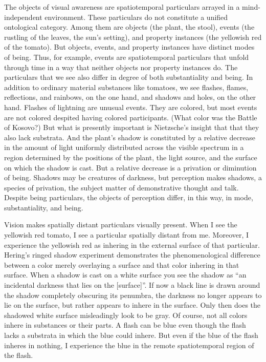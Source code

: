 \documentclass[12pt]{article}
\begin{document}
The objects of visual awareness are spatiotemporal particulars arrayed in a mind-independent environment. These particulars do not constitute a unified ontological category. Among them are objects (the plant, the stool), events (the rustling of the leaves, the sun's setting), and property instances (the yellowish red of the tomato). But objects, events, and property instances have distinct modes of being. Thus, for example, events are spatiotemporal particulars that unfold through time in a way that neither objects nor property instances do. The particulars that we see also differ in degree of both substantiality and being. In addition to ordinary material substances like tomatoes, we see flashes, flames, reflections, and rainbows, on the one hand, and shadows and holes, on the other hand. Flashes of lightning are unusual events. They are colored, but most events are not colored despited having colored participants. (What color was the Battle of Kosovo?) But what is presently important is Nietzsche's insight that that they also lack substrata. %
And the plant's shadow is constituted by a relative decrease in the amount of light uniformly distributed across the visible spectrum in a region determined by the positions of the plant, the light source, and the surface on which the shadow is cast. But a relative decrease is a privation or diminution of being. Shadows may be creatures of darkness, but perception makes shadows, a species of privation, the subject matter of demonstrative thought and talk. Despite being particulars, the objects of perception differ, in this way, in mode, substantiality, and being.

Vision makes spatially distant particulars visually present. When I see the yellowish red tomato, I see a particular spatially distant from me. Moreover, I experience the yellowish red as inhering in the external surface of that particular. Hering's ringed shadow experiment demonstrates the phenomenological difference between a color merely overlaying a surface and that color inhering in that surface. When a shadow is cast on a white surface you see the shadow as ``an incidental darkness that lies on the [surface]''. If now a black line is drawn around the shadow completely obscuring its penumbra, the darkness no longer appears to lie on the surface, but rather appears to inhere in the surface. Only then does the shadowed white surface misleadingly look to be gray. Of course, not all colors inhere in substances or their parts. A flash can be blue even though the flash lacks a substrata in which the blue could inhere. But even if the blue of the flash inheres in nothing, I experience the blue in the remote spatiotemporal region of the flash. 
\end{document}
